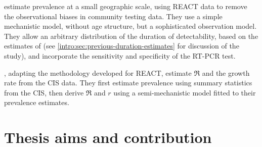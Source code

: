 \documentclass[thesis.tex]{subfiles}
\begin{document}
\Textcite{nicholsonImproving} estimate prevalence at a small geographic scale, using REACT data to remove the observational biases in community testing data.
They use a simple mechanistic model, without age structure, but a sophisticated observation model.
They allow an arbitrary distribution of the duration of detectability, based on the estimates of \textcite{hellewellPCRSensitivity} (see \cref{intro:sec:previous-duration-estimates} for discussion of the \textcite{hellewellPCRSensitivity} study), and incorporate the sensitivity and specificity of the RT-PCR test.

\Textcite{mccabeCISincidence}, adapting the methodology \textcite{ealesAppropriately} developed for REACT, estimate $\Re$ and the growth rate from the CIS data.
They first estimate prevalence using summary statistics from the CIS, then derive $\Re$ and $r$ using a semi-mechanistic model fitted to their prevalence estimates.




\section{Thesis aims and contribution} \label{intro:sec:aims}
\end{document}
